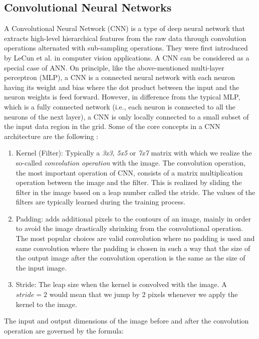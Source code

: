 \documentclass[extern,palatino]{cgMA}
\begin{document}
\subsection{Convolutional Neural Networks}
\label{convolutional_neural_networks_background}
A Convolutional Neural Network (CNN) is a type of deep neural network that extracts high-level hierarchical features from the raw data through convolution operations alternated with sub-sampling operations. They were first introduced by LeCun et al. \cite{lecun1998gradient} in computer vision applications.
A CNN can be considered as a special case of ANN. On principle, like the above-mentioned multi-layer perceptron (MLP), a CNN is a connected neural network with each neuron having its weight and bias where the dot product between the input and the neuron weights is feed forward. However, in difference from the typical MLP, which is a fully connected network (i.e., each neuron is connected to all the neurons of the next layer), a CNN is only locally connected to a small subset of the input data region in the grid. Some of the core concepts in a CNN architecture are the following \cite{lecun1998gradient}:

\begin{enumerate}
    \item Kernel (Filter): Typically a \textit{3x3}, \textit{5x5} or \textit{7x7} matrix with which we realize the so-called \textit{convolution operation} with the image. The convolution operation, the most important operation of CNN, consists of a matrix multiplication operation between the image and the filter. This is realized by sliding the filter in the image based on a leap number called the stride. The values of the filters are typically learned during the training process.
    \item Padding: adds additional pixels to the contours of an image, mainly in order to avoid the image drastically shrinking from the convolutional operation. The most popular choices are valid convolution where no padding is used and same convolution where the padding is chosen in such a way that the size of the output image after the convolution operation is the same as the size of the input image.
    \item Stride: The leap size when the kernel is convolved with the image. A $stride = 2$ would mean that we jump by 2 pixels whenever we apply the kernel to the image.
\end{enumerate}

The input and output dimensions of the image before and after the convolution operation are governed by the formula:
\end{document}
